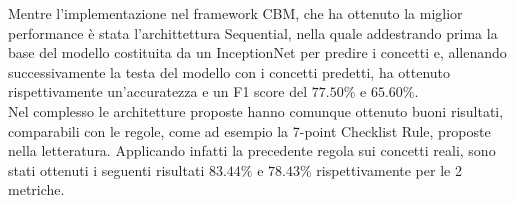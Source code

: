 \documentclass[a4print,english,lof,lot,twoside]{univpmthesis}
\begin{document}
\begin{thesisabstract}[italian]
Mentre l'implementazione nel framework CBM, che ha ottenuto la miglior performance è stata l'archittettura Sequential, nella quale addestrando prima la base del modello costituita da un InceptionNet per predire i concetti e, allenando successivamente la testa del modello con i concetti predetti, ha ottenuto rispettivamente un'accuratezza e un F1 score del $77.50\%$ e $65.60\%$. \\
Nel complesso le architetture proposte hanno comunque ottenuto buoni risultati, comparabili con le regole, come ad esempio la 7-point Checklist Rule, proposte nella letteratura. Applicando infatti la precedente regola sui concetti reali, sono stati ottenuti i seguenti risultati $83.44\%$ e $78.43\%$ rispettivamente per le 2 metriche. \\

\end{thesisabstract}


\thesistoc

\mainmatter












\backmatter

%
%



\end{document}

